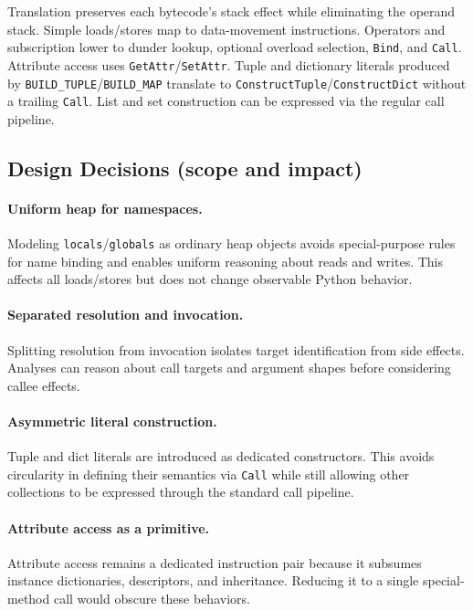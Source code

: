 Translation preserves each bytecode’s stack effect while eliminating the operand stack. Simple loads/stores map to data-movement instructions. Operators and subscription lower to dunder lookup, optional overload selection, \texttt{Bind}, and \texttt{Call}. Attribute access uses \texttt{GetAttr}/\texttt{SetAttr}. Tuple and dictionary literals produced by \texttt{BUILD\_TUPLE}/\texttt{BUILD\_MAP} translate to \texttt{ConstructTuple}/\texttt{ConstructDict} without a trailing \texttt{Call}. List and set construction can be expressed via the regular call pipeline.

\subsection{Design Decisions (scope and impact)}

\paragraph{Uniform heap for namespaces.}
Modeling \texttt{locals}/\texttt{globals} as ordinary heap objects avoids special-purpose rules for name binding and enables uniform reasoning about reads and writes. This affects all loads/stores but does not change observable Python behavior.

\paragraph{Separated resolution and invocation.}
Splitting resolution from invocation isolates target identification from side effects. Analyses can reason about call targets and argument shapes before considering callee effects.

\paragraph{Asymmetric literal construction.}
Tuple and dict literals are introduced as dedicated constructors. This avoids circularity in defining their semantics via \texttt{Call} while still allowing other collections to be expressed through the standard call pipeline.

\paragraph{Attribute access as a primitive.}
Attribute access remains a dedicated instruction pair because it subsumes instance dictionaries, descriptors, and inheritance. Reducing it to a single special-method call would obscure these behaviors.

